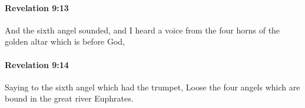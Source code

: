 		\paragraph{Revelation 9:13} %
			\label{REVELATIONNT-9-13}

			And the sixth angel sounded, and I heard a voice from the four horns of the golden altar which is before God,

			\begin{framed}
			\scriptsize
				\begin{compactdesc}
					\item[SBLG] 
				\end{compactdesc}
			\end{framed}

		\paragraph{Revelation 9:14} %
			\label{REVELATIONNT-9-14}

			Saying to the sixth angel which had the trumpet, Loose the four angels which are bound in the great river Euphrates.

